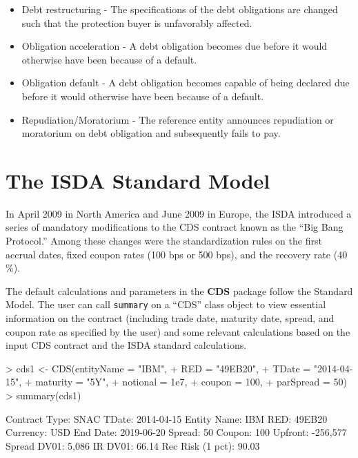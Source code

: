 \documentclass[a4paper]{article}
\begin{document}
\begin{description}
\begin{itemize}
  \item Debt restructuring - The specifications of the debt
    obligations are changed such that the protection buyer is
    unfavorably affected.
  \item Obligation acceleration - A debt obligation becomes due before
    it would otherwise have been because of a default.
  \item Obligation default - A debt obligation becomes capable of
    being declared due before it would otherwise have been because of
    a default.
  \item Repudiation/Moratorium - The reference entity announces
    repudiation or moratorium on debt obligation and subsequently
    fails to pay.
  \end{itemize}
\end{description}

\section{The ISDA Standard Model}

In April 2009 in North America and June 2009 in Europe, the ISDA
introduced a series of mandatory modifications to the CDS contract
known as the ``Big Bang Protocol.'' Among these changes were the
standardization rules on the first accrual dates, fixed coupon rates
(100 bps or 500 bps), and the recovery rate (40 \%).

The default calculations and parameters in the \textbf{CDS} package
follow the Standard Model. The user can call \texttt{summary} on a
``CDS'' class object to view essential information on the contract
(including trade date, maturity date, spread, and coupon rate as
specified by the user) and some relevant calculations based on the
input CDS contract and the ISDA standard calculations.

\begin{Schunk}
\begin{Sinput}
> cds1 <- CDS(entityName = "IBM",
+             RED = "49EB20",
+             TDate = "2014-04-15",
+             maturity = "5Y",
+             notional = 1e7,
+             coupon = 100,
+             parSpread = 50)
> summary(cds1)
\end{Sinput}
\begin{Soutput}
Contract Type:                      SNAC   TDate:                     2014-04-15
Entity Name:                         IBM   RED:                           49EB20
Currency:                            USD   End Date:                  2019-06-20
Spread:                               50   Coupon:                           100
Upfront:                        -256,577   Spread DV01:                    5,086
IR DV01:                           66.14   Rec Risk (1 pct):               90.03
\end{Soutput}
\end{Schunk}
\end{document}
